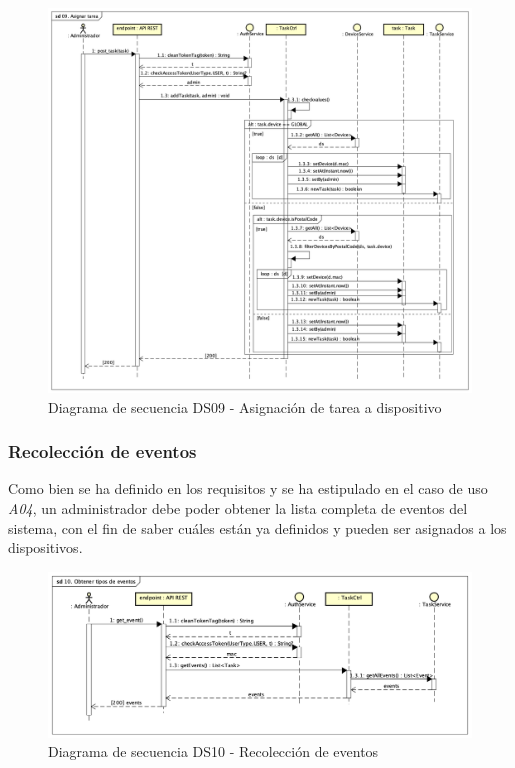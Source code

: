 \begin{figure}[H]
    \centering
    \includegraphics[width=14cm]{./img/sequence/diagram/AssignTask.png}
    \caption{Diagrama de secuencia DS09 - Asignación de tarea a dispositivo}
    \label{fig:seq.AssignTask}
\end{figure}

\newpage
\subsubsection{Recolección de eventos}
Como bien se ha definido en los requisitos y se ha estipulado en el caso de uso \textit{A04}, un administrador debe poder obtener la lista completa de eventos del sistema, con el fin de saber cuáles están ya definidos y pueden ser asignados a los dispositivos.

\begin{figure}[H]
    \centering
    \includegraphics[width=14cm]{./img/sequence/diagram/GetEvents.png}
    \caption{Diagrama de secuencia DS10 - Recolección de eventos}
    \label{fig:seq.GetEvents}
\end{figure}

